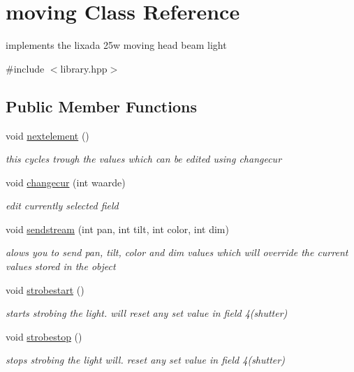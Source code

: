 \hypertarget{classmoving}{}\section{moving Class Reference}
\label{classmoving}


implements the lixada 25w moving head beam light  




{\ttfamily \#include $<$library.\+hpp$>$}

\subsection*{Public Member Functions}
\begin{DoxyCompactItemize}
\item 
\mbox{\label{classmoving_a63b60a19c43790fe98f11efea47f92bb}} 
void \hyperlink{classmoving_a63b60a19c43790fe98f11efea47f92bb}{nextelement} ()
\begin{DoxyCompactList}\small\item\em this cycles trough the values which can be edited using changecur \end{DoxyCompactList}\item 
void \hyperlink{classmoving_ae1d3737dbfcf7d8e484d8e79c62ae7c4}{changecur} (int waarde)
\begin{DoxyCompactList}\small\item\em edit currently selected field \end{DoxyCompactList}\item 
\mbox{\label{classmoving_a662632566973c21929829c538ed3a135}} 
void \hyperlink{classmoving_a662632566973c21929829c538ed3a135}{sendstream} (int pan, int tilt, int color, int dim)
\begin{DoxyCompactList}\small\item\em alows you to send pan, tilt, color and dim values which will override the current values stored in the object \end{DoxyCompactList}\item 
\mbox{\label{classmoving_a1c9ef53c238d2cbdd5e0fe4ca1d4c6b9}} 
void \hyperlink{classmoving_a1c9ef53c238d2cbdd5e0fe4ca1d4c6b9}{strobestart} ()
\begin{DoxyCompactList}\small\item\em starts strobing the light. will reset any set value in field 4(shutter) \end{DoxyCompactList}\item 
\mbox{\label{classmoving_ab61d7e76fc4fb599d0411d9ea0e2bd88}} 
void \hyperlink{classmoving_ab61d7e76fc4fb599d0411d9ea0e2bd88}{strobestop} ()
\begin{DoxyCompactList}\small\item\em stops strobing the light will. reset any set value in field 4(shutter) \end{DoxyCompactList}\end{DoxyCompactItemize}
